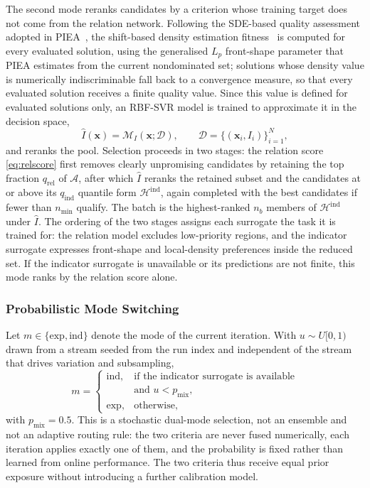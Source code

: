 \documentclass[final,5p,times,twocolumn]{elsarticle}
\newcommand{\vx}{\mathbf{x}}
\begin{document}
The second mode reranks candidates by a criterion whose training target does not
come from the relation network. Following the SDE-based quality assessment
adopted in PIEA~\cite{ref:piea}, the shift-based density estimation
fitness~\cite{ref:sde} is computed for every evaluated solution, using the
generalised $L_p$ front-shape parameter that PIEA estimates from the current
nondominated set; solutions whose density value is numerically indiscriminable
fall back to a convergence measure, so that every evaluated solution receives a
finite quality value. Since this value is defined for evaluated solutions only,
an RBF-SVR model is trained to approximate it in the decision space,
\begin{equation}
\widehat I(\vx)=\mathcal{M}_I(\vx;\mathcal{D}),
\qquad
\mathcal{D}=\{(\vx_i,I_i)\}_{i=1}^{N},
\label{eq:svr}
\end{equation}
and reranks the pool. Selection proceeds in two stages: the relation score
\eqref{eq:relscore} first removes clearly unpromising candidates by retaining
the top fraction $q_{\mathrm{rel}}$ of $\mathcal{A}$, after which $\widehat I$
reranks the retained subset and the candidates at or above its
$q_{\mathrm{ind}}$ quantile form $\mathcal{H}^{\mathrm{ind}}$, again completed
with the best candidates if fewer than $n_{\min}$ qualify. The batch is the
highest-ranked $n_b$ members of $\mathcal{H}^{\mathrm{ind}}$ under $\widehat I$.
The ordering of the two stages assigns each surrogate the task it is trained
for: the relation model excludes low-priority regions, and the indicator
surrogate expresses front-shape and local-density preferences inside the reduced
set. If the indicator surrogate is unavailable or its predictions are not
finite, this mode ranks by the relation score alone.

\subsubsection{Probabilistic Mode Switching}
\label{sec:method:candidate:mix}

Let $m\in\{\mathrm{exp},\mathrm{ind}\}$ denote the mode of the current
iteration. With $u\sim U[0,1)$ drawn from a stream seeded from the run index and
independent of the stream that drives variation and subsampling,
\begin{equation}
m=
\begin{cases}
\mathrm{ind}, & \text{if the indicator surrogate is available}\\
              & \text{and } u<p_{\mathrm{mix}},\\[2pt]
\mathrm{exp}, & \text{otherwise},
\end{cases}
\label{eq:mode}
\end{equation}
with $p_{\mathrm{mix}}=0.5$. This is a stochastic dual-mode selection, not an
ensemble and not an adaptive routing rule: the two criteria are never fused
numerically, each iteration applies exactly one of them, and the probability is
fixed rather than learned from online performance. The two criteria thus receive
equal prior exposure without introducing a further calibration model.
\end{document}
